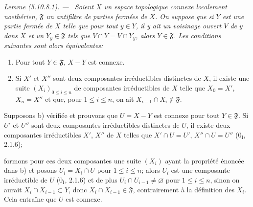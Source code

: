 \documentclass[10pt,oneside]{book}
\newcommand{\oldpage}[2][]{%
  \setcounter{footnote}{0}%
  \marginpar{\scriptsize\textbf{#1}~|~#2}\ignorespaces}
\newenvironment{lemma}[1][]{%
  \par\medskip\noindent\itshape Lemme (#1). ---\ }{\par}
\begin{document}
\begin{lemma}[5.10.8.1]
\label{IV.2.s5.10.8.1-fr}
Soient $X$ un espace topologique connexe localement noethérien,
$\mathfrak F$ un antifiltre de parties fermées de $X$. On suppose que si $Y$
est une partie fermée de $X$ telle que pour tout $y\in Y$, il y ait un
voisinage ouvert $V$ de $y$ dans $X$ et un $Y_y\in\mathfrak F$ tels que
$V\cap Y=V\cap Y_y$, alors $Y\in\mathfrak F$. Les conditions suivantes sont
alors équivalentes:
\begin{enumerate}
\item[a)] Pour tout $Y\in\mathfrak F$, $X-Y$ est connexe.
\item[b)] Si $X'$ et $X''$ sont deux composantes irréductibles distinctes de
$X$, il existe une suite $(X_i)_{0\leq i\leq n}$ de composantes irréductibles
de $X$ telle que $X_0=X'$, $X_n=X''$ et que, pour $1\leq i\leq n$, on ait
$X_{i-1}\cap X_i\notin\mathfrak F$.
\end{enumerate}
\end{lemma}

Supposons b) vérifiée et prouvons que $U=X-Y$ est connexe pour tout
$Y\in\mathfrak F$. Si $U'$ et $U''$ sont deux composantes irréductibles
distinctes de $U$, il existe deux composantes irréductibles $X'$, $X''$ de
$X$ telles que $X'\cap U=U'$, $X''\cap U=U''$ (0$_\mathrm I$, 2.1.6);

\oldpage[IV-2]{117}

formons pour ces deux composantes une suite $(X_i)$ ayant la propriété énoncée
dans b) et posons $U_i=X_i\cap U$ pour $1\leq i\leq n$; alors $U_i$ est une
composante irréductible de $U$ (0$_\mathrm I$, 2.1.6) et de plus
$U_i\cap U_{i-1}\neq\varnothing$ pour $1\leq i\leq n$, sinon on aurait
$X_i\cap X_{i-1}\subset Y$, donc $X_i\cap X_{i-1}\in\mathfrak F$,
contrairement à la définition des $X_i$. Cela entraîne que $U$ est connexe.
\end{document}
